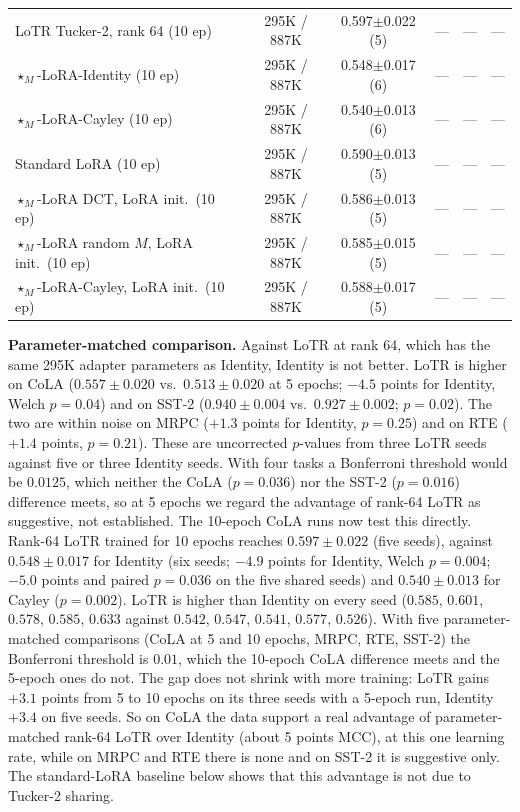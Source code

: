 \documentclass{article}
\theoremstyle{plain}
\begin{document}
\begin{table}[h]
\begin{tabular}{lccccc}
\midrule
LoTR Tucker-2, rank 64 (10 ep)
  & 295K / 887K
  & 0.597$\pm$0.022 (5) & --- & --- & --- \\
$\star_M$-LoRA-Identity (10 ep)
  & 295K / 887K
  & 0.548$\pm$0.017 (6) & --- & --- & --- \\
$\star_M$-LoRA-Cayley (10 ep)
  & 295K / 887K
  & 0.540$\pm$0.013 (6) & --- & --- & --- \\
Standard LoRA (10 ep)
  & 295K / 887K
  & 0.590$\pm$0.013 (5) & --- & --- & --- \\
$\star_M$-LoRA DCT, LoRA init.\ (10 ep)
  & 295K / 887K
  & 0.586$\pm$0.013 (5) & --- & --- & --- \\
$\star_M$-LoRA random $M$, LoRA init.\ (10 ep)
  & 295K / 887K
  & 0.585$\pm$0.015 (5) & --- & --- & --- \\
$\star_M$-LoRA-Cayley, LoRA init.\ (10 ep)
  & 295K / 887K
  & 0.588$\pm$0.017 (5) & --- & --- & --- \\
\bottomrule
\end{tabular}
\end{table}

\noindent
\textbf{Parameter-matched comparison.}
Against LoTR at rank 64, which has the same 295K adapter parameters as Identity, Identity is not better.
LoTR is higher on CoLA ($0.557\pm0.020$ vs.\ $0.513\pm0.020$ at 5 epochs; $-4.5$ points for Identity, Welch $p=0.04$)
and on SST-2 ($0.940\pm0.004$ vs.\ $0.927\pm0.002$; $p=0.02$).
The two are within noise on MRPC ($+1.3$ points for Identity, $p=0.25$) and on RTE ($+1.4$ points, $p=0.21$).
These are uncorrected $p$-values from three LoTR seeds against five or three Identity seeds.
With four tasks a Bonferroni threshold would be $0.0125$, which neither the CoLA ($p=0.036$) nor the SST-2
($p=0.016$) difference meets, so at 5 epochs we regard the advantage of rank-64 LoTR as suggestive, not established.
The 10-epoch CoLA runs now test this directly.
Rank-64 LoTR trained for 10 epochs reaches $0.597\pm0.022$ (five seeds), against $0.548\pm0.017$ for Identity
(six seeds; $-4.9$ points for Identity, Welch $p=0.004$; $-5.0$ points and paired $p=0.036$ on the five shared seeds)
and $0.540\pm0.013$ for Cayley ($p=0.002$).
LoTR is higher than Identity on every seed ($0.585$, $0.601$, $0.578$, $0.585$, $0.633$ against $0.542$, $0.547$, $0.541$, $0.577$, $0.526$).
With five parameter-matched comparisons (CoLA at 5 and 10 epochs, MRPC, RTE, SST-2) the Bonferroni threshold is $0.01$,
which the 10-epoch CoLA difference meets and the 5-epoch ones do not.
The gap does not shrink with more training: LoTR gains $+3.1$ points from 5 to 10 epochs on its three seeds with a 5-epoch run, Identity $+3.4$ on five seeds.
So on CoLA the data support a real advantage of parameter-matched rank-64 LoTR over Identity (about 5 points MCC),
at this one learning rate, while on MRPC and RTE there is none and on SST-2 it is suggestive only.
The standard-LoRA baseline below shows that this advantage is not due to Tucker-2 sharing.
\end{document}
